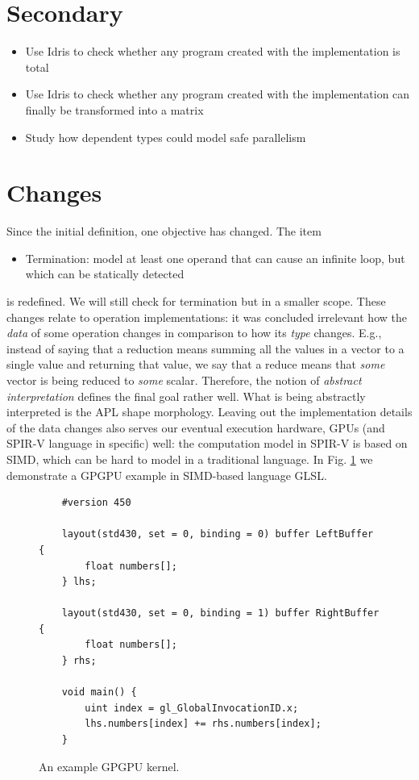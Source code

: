 \documentclass{report}
\begin{document}
\section{Secondary}

\begin{itemize}
  \item Use Idris to check whether any program created with the implementation is total
  \item Use Idris to check whether any program created with the implementation can finally be transformed into a matrix
  \item Study how dependent types could model safe parallelism
\end{itemize}

\section{Changes}

Since the initial definition, one objective has changed. The item

\begin{itemize}
  \item Termination: model at least one operand that can cause an infinite loop, but which can be statically detected
\end{itemize}

is redefined. We will still check for termination but in a smaller scope. These changes relate to operation implementations: it was concluded irrelevant how the \emph{data} of some operation changes in comparison to how its \emph{type} changes. E.g., instead of saying that a reduction means summing all the values in a vector to a single value and returning that value, we say that a reduce means that \emph{some} vector is being reduced to \emph{some} scalar. Therefore, the notion of \emph{abstract interpretation} defines the final goal rather well. What is being abstractly interpreted is the APL shape morphology. Leaving out the implementation details of the data changes also serves our eventual execution hardware, \glspl{GPU} (and SPIR-V language in specific) well: the computation model in SPIR-V is based on \gls{SIMD}, which can be hard to model in a traditional language. In Fig. \ref{fig:kernel} we demonstrate a \gls{GPGPU} example in SIMD-based language GLSL.

\begin{figure}
    \begin{lstlisting}
    #version 450

    layout(std430, set = 0, binding = 0) buffer LeftBuffer {
        float numbers[];
    } lhs;

    layout(std430, set = 0, binding = 1) buffer RightBuffer {
        float numbers[];
    } rhs;

    void main() {
        uint index = gl_GlobalInvocationID.x;
        lhs.numbers[index] += rhs.numbers[index];
    }
    \end{lstlisting}
    \caption{An example GPGPU kernel.}
    \label{fig:kernel}
\end{figure}
\end{document}
